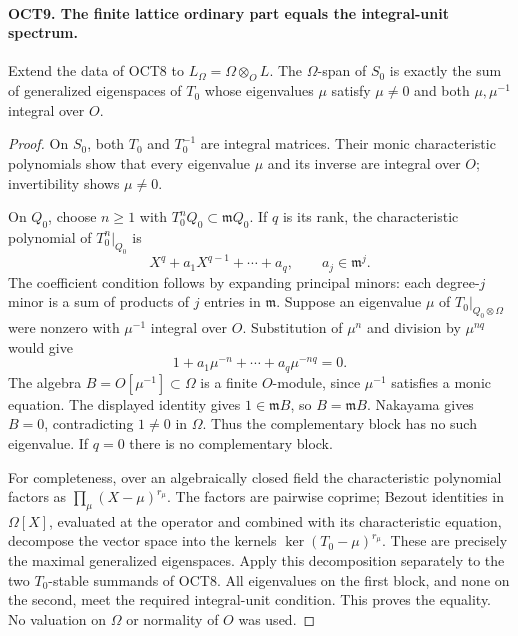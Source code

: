 \documentclass[11pt,a4paper]{article}
\numberwithin{equation}{section}
\theoremstyle{remark}\newtheorem{remark}[theorem]{Remark}
\begin{document}
\paragraph{OCT9. The finite lattice ordinary part equals the integral-unit spectrum.}
\label{claim:OCT9}
Extend the data of OCT8 to $L_\Omega=\Omega\otimes_O L$.
The $\Omega$-span of $S_0$ is exactly the sum of generalized
eigenspaces of $T_0$ whose eigenvalues $\mu$ satisfy
$\mu\ne0$ and both $\mu,\mu^{-1}$ integral over $O$.
\begin{proof}
On $S_0$, both $T_0$ and $T_0^{-1}$ are integral matrices.
Their monic characteristic polynomials show that every
eigenvalue $\mu$ and its inverse are integral over $O$;
invertibility shows $\mu\ne0$.

On $Q_0$, choose $n\geq1$ with
$T_0^nQ_0\subset\mathfrak m Q_0$.  If $q$ is its rank,
the characteristic polynomial of $T_0^n|_{Q_0}$ is
\[
             X^q+a_1X^{q-1}+\cdots+a_q,
                              \qquad a_j\in\mathfrak m^j.
\]
The coefficient condition follows by expanding principal
minors: each degree-$j$ minor is a sum of products of $j$
entries in $\mathfrak m$.  Suppose an eigenvalue $\mu$ of
$T_0|_{Q_0\otimes\Omega}$ were nonzero with $\mu^{-1}$
integral over $O$.  Substitution of $\mu^n$ and division by
$\mu^{nq}$ would give
\[
              1+a_1\mu^{-n}+\cdots+a_q\mu^{-nq}=0.
\]
The algebra $B=O[\mu^{-1}]\subset\Omega$ is a finite
$O$-module, since $\mu^{-1}$ satisfies a monic equation.
The displayed identity gives $1\in\mathfrak m B$, so
$B=\mathfrak m B$.  Nakayama gives $B=0$, contradicting
$1\ne0$ in $\Omega$.  Thus the complementary block has no
such eigenvalue.  If $q=0$ there is no complementary block.

For completeness, over an algebraically closed field the
characteristic polynomial factors as
$\prod_\mu(X-\mu)^{r_\mu}$.  The factors are pairwise
coprime; Bezout identities in $\Omega[X]$, evaluated at the
operator and combined with its characteristic equation,
decompose the vector space into the kernels
$\ker(T_0-\mu)^{r_\mu}$.  These are precisely the maximal
generalized eigenspaces.  Apply this decomposition separately
to the two $T_0$-stable summands of OCT8.  All eigenvalues on
the first block, and none on the second, meet the required
integral-unit condition.  This proves the equality.  No
valuation on $\Omega$ or normality of $O$ was used.
\end{proof}

\end{document}
